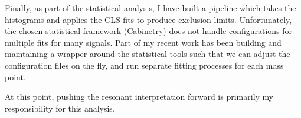 \documentclass[12pt]{article}
\begin{document}
Finally, as part of the statistical analysis, I have built a pipeline which
takes the histograms and applies the CLS fits to produce exclusion limits.
Unfortunately, the chosen statistical framework (Cabinetry) \cite{cabinetry}
does not handle configurations for multiple fits for many signals. Part of my
recent work has been building and maintaining a wrapper around the statistical
tools such that we can adjust the configuration files on the fly, and run
separate fitting processes for each mass point.

At this point, pushing the resonant interpretation forward is primarily my
responsibility for this analysis.


\newpage
\clearpage
\end{document}
